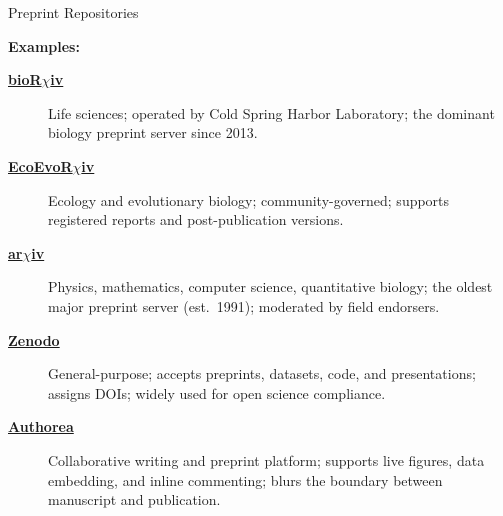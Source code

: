 \documentclass{beamer}
\begin{document}
\begin{frame}{Preprint Repositories}

  \footnotesize

  \textbf{Examples:}

  \begin{description}
    \item[\href{https://www.biorxiv.org}{\textbf{bioR$\chi$iv}}]
      Life sciences; operated by Cold Spring Harbor Laboratory;
      the dominant biology preprint server since 2013.

    \item[\href{https://ecoevorxiv.org}{\textbf{EcoEvoR$\chi$iv}}]
      Ecology and evolutionary biology; community-governed;
      supports registered reports and post-publication versions.

    \item[\href{https://arxiv.org}{\textbf{ar$\chi$iv}}]
      Physics, mathematics, computer science, quantitative biology;
      the oldest major preprint server (est.\ 1991); moderated by
      field endorsers.

    \item[\href{https://zenodo.org}{\textbf{Zenodo}}]
      General-purpose; accepts preprints, datasets,
      code, and presentations; assigns DOIs; widely used for
      open science compliance.

    \item[\href{https://www.authorea.com}{\textbf{Authorea}}]
      Collaborative writing and preprint platform; supports
      live figures, data embedding, and inline commenting;
      blurs the boundary between manuscript and publication.
  \end{description}

\end{frame}
\end{document}
